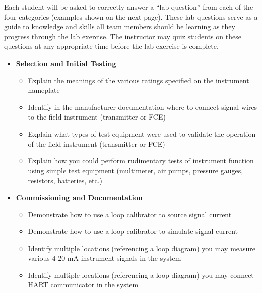 \documentclass[12pt,a4paper]{article}
\begin{document}
Each student will be asked to correctly answer a ``lab question'' from each of the four categories (examples shown on the next page).  These lab questions serve as a guide to knowledge and skills all team members should be learning as they progress through the lab exercise.  The instructor may quiz students on these questions at any appropriate time before the lab exercise is complete.

\vfil \eject

\noindent
{} 

\begin{itemize}
\item{} {\bf Selection and Initial Testing}
\begin{itemize}

\item{} Explain the meanings of the various ratings specified on the instrument nameplate
\item{} Identify in the manufacturer documentation where to connect signal wires to the field instrument (transmitter or FCE)
\item{} Explain what types of test equipment were used to validate the operation of the field instrument (transmitter or FCE)
\item{} Explain how you could perform rudimentary tests of instrument function using simple test equipment (multimeter, air pumps, pressure gauges, resistors, batteries, etc.)
\end{itemize}
\end{itemize}

\filbreak

\begin{itemize}
\item{} {\bf Commissioning and Documentation}
\begin{itemize}

\item{} Demonstrate how to use a loop calibrator to source signal current
\item{} Demonstrate how to use a loop calibrator to simulate signal current
\item{} Identify multiple locations (referencing a loop diagram) you may measure various 4-20 mA instrument signals in the system
\item{} Identify multiple locations (referencing a loop diagram) you may connect HART communicator in the system
\end{itemize}
\end{itemize}
\end{document}
